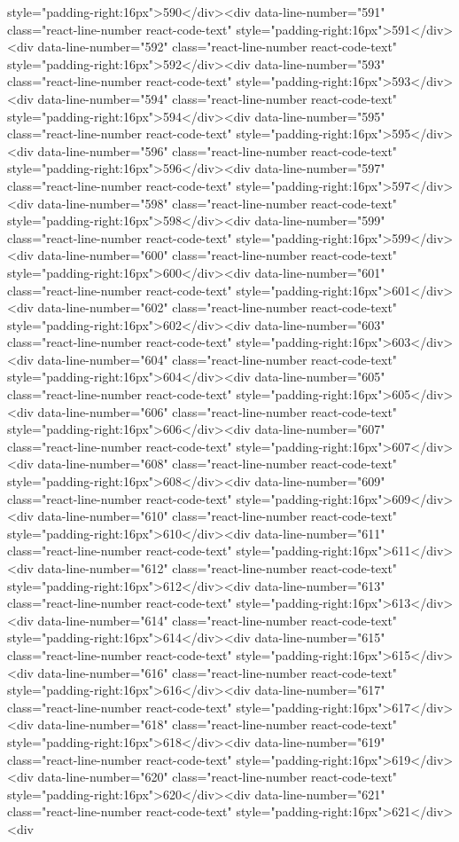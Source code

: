 style="padding-right:16px">590</div><div data-line-number="591" class="react-line-number react-code-text" style="padding-right:16px">591</div><div data-line-number="592" class="react-line-number react-code-text" style="padding-right:16px">592</div><div data-line-number="593" class="react-line-number react-code-text" style="padding-right:16px">593</div><div data-line-number="594" class="react-line-number react-code-text" style="padding-right:16px">594</div><div data-line-number="595" class="react-line-number react-code-text" style="padding-right:16px">595</div><div data-line-number="596" class="react-line-number react-code-text" style="padding-right:16px">596</div><div data-line-number="597" class="react-line-number react-code-text" style="padding-right:16px">597</div><div data-line-number="598" class="react-line-number react-code-text" style="padding-right:16px">598</div><div data-line-number="599" class="react-line-number react-code-text" style="padding-right:16px">599</div><div data-line-number="600" class="react-line-number react-code-text" style="padding-right:16px">600</div><div data-line-number="601" class="react-line-number react-code-text" style="padding-right:16px">601</div><div data-line-number="602" class="react-line-number react-code-text" style="padding-right:16px">602</div><div data-line-number="603" class="react-line-number react-code-text" style="padding-right:16px">603</div><div data-line-number="604" class="react-line-number react-code-text" style="padding-right:16px">604</div><div data-line-number="605" class="react-line-number react-code-text" style="padding-right:16px">605</div><div data-line-number="606" class="react-line-number react-code-text" style="padding-right:16px">606</div><div data-line-number="607" class="react-line-number react-code-text" style="padding-right:16px">607</div><div data-line-number="608" class="react-line-number react-code-text" style="padding-right:16px">608</div><div data-line-number="609" class="react-line-number react-code-text" style="padding-right:16px">609</div><div data-line-number="610" class="react-line-number react-code-text" style="padding-right:16px">610</div><div data-line-number="611" class="react-line-number react-code-text" style="padding-right:16px">611</div><div data-line-number="612" class="react-line-number react-code-text" style="padding-right:16px">612</div><div data-line-number="613" class="react-line-number react-code-text" style="padding-right:16px">613</div><div data-line-number="614" class="react-line-number react-code-text" style="padding-right:16px">614</div><div data-line-number="615" class="react-line-number react-code-text" style="padding-right:16px">615</div><div data-line-number="616" class="react-line-number react-code-text" style="padding-right:16px">616</div><div data-line-number="617" class="react-line-number react-code-text" style="padding-right:16px">617</div><div data-line-number="618" class="react-line-number react-code-text" style="padding-right:16px">618</div><div data-line-number="619" class="react-line-number react-code-text" style="padding-right:16px">619</div><div data-line-number="620" class="react-line-number react-code-text" style="padding-right:16px">620</div><div data-line-number="621" class="react-line-number react-code-text" style="padding-right:16px">621</div><div 